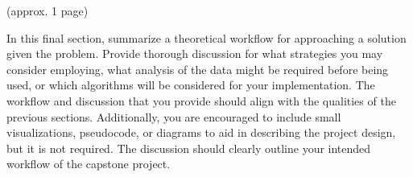\documentclass[11pt, a4paper, twocolumn]{article}
\begin{document}
(approx. 1 page)

In this final section, summarize a theoretical workflow for approaching a solution given the problem. Provide thorough discussion for what strategies you may consider employing, what analysis of the data might be required before being used, or which algorithms will be considered for your implementation. The workflow and discussion that you provide should align with the qualities of the previous sections. Additionally, you are encouraged to include small visualizations, pseudocode, or diagrams to aid in describing the project design, but it is not required. The discussion should clearly outline your intended workflow of the capstone project.


{}
\end{document}
